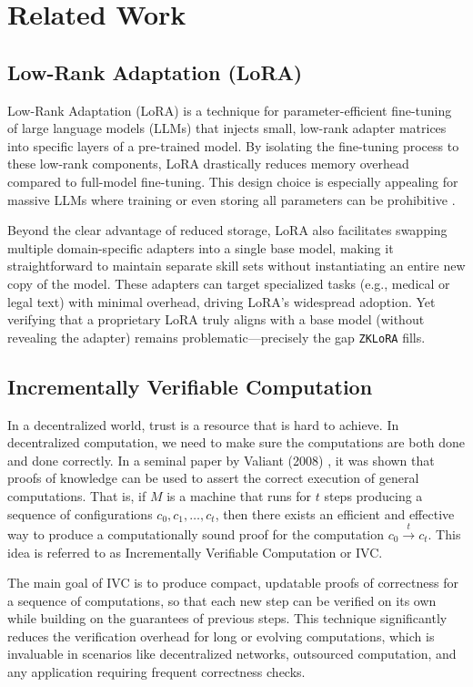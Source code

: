 \documentclass[11pt]{article}
\begin{document}
\section{Related Work}

\subsection{Low-Rank Adaptation (LoRA)}
Low-Rank Adaptation (LoRA) \cite{hu2021lora} is a technique for parameter-efficient fine-tuning of large language models (LLMs) that injects small, low-rank adapter matrices into specific layers of a pre-trained model. By isolating the fine-tuning process to these low-rank components, LoRA drastically reduces memory overhead compared to full-model fine-tuning. This design choice is especially appealing for massive LLMs where training or even storing all parameters can be prohibitive \cite{ding2022delta}.

Beyond the clear advantage of reduced storage, LoRA also facilitates swapping multiple domain-specific adapters into a single base model, making it straightforward to maintain separate skill sets without instantiating an entire new copy of the model. These adapters can target specialized tasks (e.g., medical or legal text) with minimal overhead, driving LoRA’s widespread adoption. Yet verifying that a proprietary LoRA truly aligns with a base model (without revealing the adapter) remains problematic—precisely the gap \texttt{ZKLoRA} fills.

\subsection{Incrementally Verifiable Computation}
In a decentralized world, trust is a resource that is hard to achieve. In decentralized computation, we need to make sure the computations are both done and done correctly. In a seminal paper by Valiant (2008) \cite{valiant2008incrementally}, it was shown that proofs of knowledge can be used to assert the correct execution of general computations. That is, if $M$ is a machine that runs for $t$ steps producing a sequence of configurations $c_0,c_1,\dots,c_t$, then there exists an efficient and effective way to produce a computationally sound proof for the computation $c_0  \xrightarrow{t} c_t$. This idea is referred to as Incrementally Verifiable Computation or IVC.

The main goal of IVC is to produce compact, updatable proofs of correctness for a sequence of computations, so that each new step can be verified on its own while building on the guarantees of previous steps. This technique significantly reduces the verification overhead for long or evolving computations, which is invaluable in scenarios like decentralized networks, outsourced computation, and any application requiring frequent correctness checks.
\end{document}
